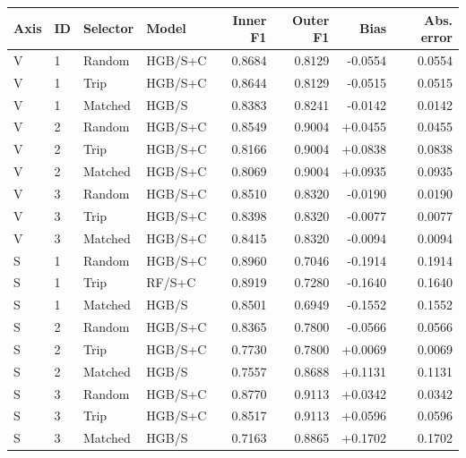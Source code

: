 \begin{singlespace}\small
\noindent\begin{minipage}{\linewidth}
\centering
{}
\begin{tabular}{@{}l l l l r r r r@{}}
\toprule Axis & ID & Selector & Model & Inner F1 & Outer F1 & Bias & Abs. error \\ \midrule
V & 1 & Random & HGB/S+C & 0.8684 & 0.8129 & -0.0554 & 0.0554 \\
V & 1 & Trip & HGB/S+C & 0.8644 & 0.8129 & -0.0515 & 0.0515 \\
V & 1 & Matched & HGB/S & 0.8383 & 0.8241 & -0.0142 & 0.0142 \\
V & 2 & Random & HGB/S+C & 0.8549 & 0.9004 & +0.0455 & 0.0455 \\
V & 2 & Trip & HGB/S+C & 0.8166 & 0.9004 & +0.0838 & 0.0838 \\
V & 2 & Matched & HGB/S+C & 0.8069 & 0.9004 & +0.0935 & 0.0935 \\
V & 3 & Random & HGB/S+C & 0.8510 & 0.8320 & -0.0190 & 0.0190 \\
V & 3 & Trip & HGB/S+C & 0.8398 & 0.8320 & -0.0077 & 0.0077 \\
V & 3 & Matched & HGB/S+C & 0.8415 & 0.8320 & -0.0094 & 0.0094 \\
S & 1 & Random & HGB/S+C & 0.8960 & 0.7046 & -0.1914 & 0.1914 \\
S & 1 & Trip & RF/S+C & 0.8919 & 0.7280 & -0.1640 & 0.1640 \\
S & 1 & Matched & HGB/S & 0.8501 & 0.6949 & -0.1552 & 0.1552 \\
S & 2 & Random & HGB/S+C & 0.8365 & 0.7800 & -0.0566 & 0.0566 \\
S & 2 & Trip & HGB/S+C & 0.7730 & 0.7800 & +0.0069 & 0.0069 \\
S & 2 & Matched & HGB/S & 0.7557 & 0.8688 & +0.1131 & 0.1131 \\
S & 3 & Random & HGB/S+C & 0.8770 & 0.9113 & +0.0342 & 0.0342 \\
S & 3 & Trip & HGB/S+C & 0.8517 & 0.9113 & +0.0596 & 0.0596 \\
S & 3 & Matched & HGB/S & 0.7163 & 0.8865 & +0.1702 & 0.1702 \\
\bottomrule\end{tabular}
\end{minipage}
\end{singlespace}
\par\medskip
